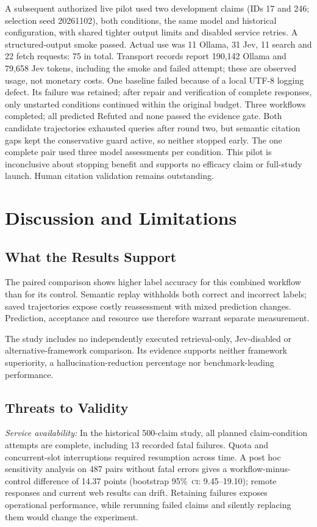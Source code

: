 \documentclass[conference]{IEEEtran}
\newcommand{\CI}{\textsc{ci}}
\newcommand{\pct}{\%}
\begin{document}
A subsequent authorized live pilot used two development claims (IDs 17 and 246; selection seed 20261102), both conditions, the same model and historical configuration, with shared tighter output limits and disabled service retries. A structured-output smoke passed. Actual use was 11 Ollama, 31 Jev, 11 search and 22 fetch requests: 75 in total. Transport records report 190,142 Ollama and 79,658 Jev tokens, including the smoke and failed attempt; these are observed usage, not monetary costs. One baseline failed because of a local UTF-8 logging defect. Its failure was retained; after repair and verification of complete responses, only unstarted conditions continued within the original budget. Three workflows completed; all predicted Refuted and none passed the evidence gate. Both candidate trajectories exhausted queries after round two, but semantic citation gaps kept the conservative guard active, so neither stopped early. The one complete pair used three model assessments per condition. This pilot is inconclusive about stopping benefit and supports no efficacy claim or full-study launch. Human citation validation remains outstanding.

\balance
\section{Discussion and Limitations}
\subsection{What the Results Support}
The paired comparison shows higher label accuracy for this combined workflow than for its control. Semantic replay withholds both correct and incorrect labels; saved trajectories expose costly reassessment with mixed prediction changes. Prediction, acceptance and resource use therefore warrant separate measurement.

The study includes no independently executed retrieval-only, Jev-disabled or alternative-framework comparison. Its evidence supports neither framework superiority, a hallucination-reduction percentage nor benchmark-leading performance.

\subsection{Threats to Validity}
\textit{Service availability:} In the historical 500-claim study, all planned claim-condition attempts are complete, including 13 recorded fatal failures. Quota and concurrent-slot interruptions required resumption across time. A post hoc sensitivity analysis on 487 pairs without fatal errors gives a workflow-minus-control difference of 14.37 points (bootstrap 95\pct\ \CI: 9.45--19.10); remote responses and current web results can drift. Retaining failures exposes operational performance, while rerunning failed claims and silently replacing them would change the experiment.
\end{document}
